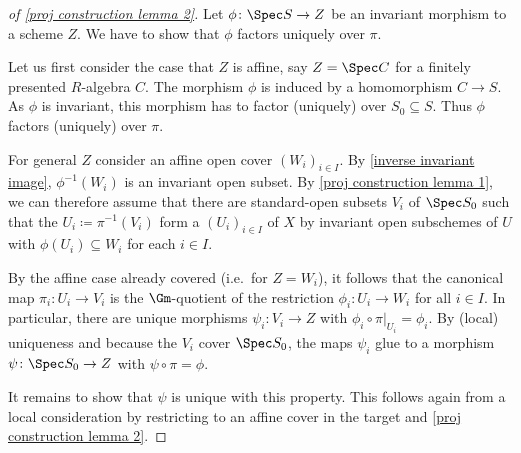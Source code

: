 \begin{proof}[of \cref{proj construction lemma 2}]
  Let $\phi\colon \Spec S \to Z$ be an invariant morphism to a scheme $Z$.
  We have to show that $\phi$ factors uniquely over $\pi$.

  Let us first consider the case that $Z$ is affine, say $Z = \Spec C$
  for a finitely presented $R$-algebra $C$.  The morphism $\phi$ is
  induced by a homomorphism $C \to S$.  As $\phi$ is invariant, this
  morphism has to factor (uniquely) over $S_0 \subseteq S$.  Thus
  $\phi$ factors (uniquely) over $\pi$.

  For general $Z$ consider an affine open cover $(W_i)_{i \in I}$.
  By \cref{inverse invariant image}, $\phi^{-1}(W_i)$ is
  an invariant open subset.  By \cref{proj construction lemma 1}, we
  can therefore assume that there are standard-open subsets $V_i$ of
  $\Spec S_0$ such that the $U_i \coloneqq \pi^{-1}(V_i)$ form a
  $(U_i)_{i \in I}$ of $X$ by invariant open subschemes of $U$ with
  $\phi(U_i) \subseteq W_i$ for each $i \in I$.

  By the affine case already covered (i.e.\ for $Z = W_i$), it follows
  that the canonical map $\pi_i\colon U_i \to V_i$ is the
  $\Gm$-quotient of the restriction $\phi_i\colon U_i \to W_i$ for all
  $i \in I$. In particular, there are unique morphisms $\psi_i\colon
  V_i \to Z$ with $\phi_i \circ \pi|_{U_i} = \phi_i$.  By (local) uniqueness
  and because the $V_i$ cover $\Spec S_0$, the maps $\psi_i$ glue to a
  morphism $\psi\colon \Spec S_0 \to Z$ with $\psi \circ \pi = \phi$.

  It remains to show that $\psi$ is unique with this property. This
  follows again from a local consideration by restricting to an affine
  cover in the target and \cref{proj construction lemma 2}.
\end{proof}

